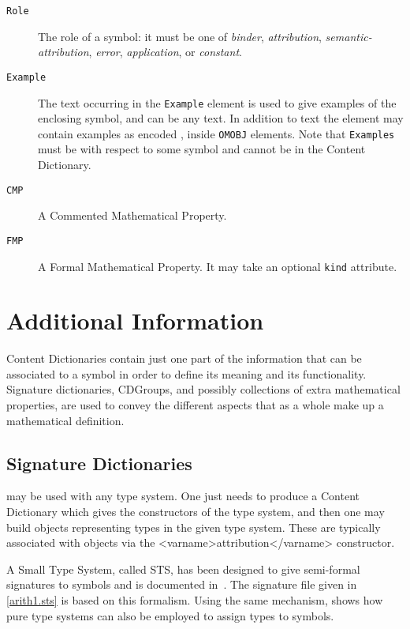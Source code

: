 \begin{description}
\item[\lstinline|Role|] The role of a symbol: it must be one of \emph{binder},
  \emph{attribution}, \emph{semantic-attribution}, \emph{error}, \emph{application}, or
  \emph{constant}.
\item[\lstinline|Example|] The text occurring in the \lstinline|Example| element is used
  to give examples of the enclosing symbol, and can be any \XML text. In addition to text
  the element may contain examples as \XML encoded \OM, inside \lstinline|OMOBJ|
  elements.  Note that \lstinline|Examples| must be with respect to some symbol and
  cannot be  in the Content Dictionary.
\item[\lstinline|CMP|] A Commented Mathematical Property.
\item[\lstinline|FMP|] A Formal Mathematical Property.  It may take an optional
  \lstinline|kind| attribute.
\end{description}

\section{Additional Information}\label{addfiles}

Content Dictionaries contain just one part of the information that can be associated to a
symbol in order to define its meaning and its functionality. \OM Signature dictionaries,
CDGroups, and possibly collections of extra mathematical properties, are used to convey
the different aspects that as a whole make up a mathematical definition.

\subsection{Signature Dictionaries}\label{sigfiles}

\OM may be used with any type system. One just needs to produce a Content Dictionary which
gives the constructors of the type system, and then one may build \OM objects representing
types in the given type system. These are typically associated with \OM objects via the
\OM <varname>attribution</varname> constructor.

A Small Type System, called STS, has been designed to give semi-formal signatures to \OM
symbols and is documented in~\cite{OM_D132c}.  The signature file given in
\ref{arith1.sts} is based on this formalism. Using the same mechanism, \cite{OMD132b}
shows how pure type systems can also be employed to assign types to \OM symbols.

